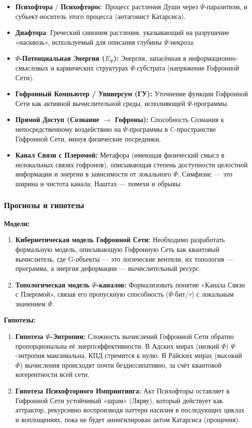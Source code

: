 \documentclass[a4paper,12pt]{article}
\begin{document}
\begin{itemize}
	\item \textbf{Психофтора} / \textbf{Психофторос}: Процесс растления Души через $\Psi$-паразитизм, и субъект-носитель этого процесса (антагонист Катарсиса).
	\item \textbf{Диафтора}: Греческий синоним растления, указывающий на разрушение «насквозь», используемый для описания глубины $\Psi$-некроза.
	\item \textbf{$\Psi$-Потенциальная Энергия ($E_{\Psi}$):} Энергия, запасённая в информационно-смысловых и кармических структурах $\Psi$-субстрата (напряжение Гофронной Сети).
	\item \textbf{Гофронный Компьютер / Универсум (ГУ):} Уточнение функции Гофронной Сети как активной вычислительной среды, исполняющей $\Psi$-программы.
	\item \textbf{Прямой Доступ (Сознание $\to$ Гофроны):} Способность Сознания к непосредственному воздействию на $\Psi$-программы в $\mathbb{C}$-пространстве Гофронной Сети, минуя физические посредники.
	\item \textbf{Канал Связи с Плеромой:} Метафора (имеющая физический смысл в нелокальных связях гофронов), описывающая степень доступности целостной информации и энергии в зависимости от локального $\Phi$. Симфизис — это ширина и чистота канала; Наштах — помехи и обрывы.
\end{itemize}

\subsubsection{Прогнозы и гипотезы}

\textbf{Модели:}
\begin{enumerate}
	\item \textbf{Кибернетическая модель Гофронной Сети:} Необходимо разработать формальную модель, описывающую Гофронную Сеть как квантовый вычислитель, где G-объекты — это логические вентили, их топология — программа, а энергия деформации — вычислительный ресурс.
	\item \textbf{Топологическая модель $\Psi$-каналов:} Формализовать понятие «Канала Связи с Плеромой», связав его пропускную способность ($\Psi$-бит/$\tau$) с локальным значением $\Phi$.
\end{enumerate}

\textbf{Гипотезы:}
\begin{enumerate}
	\item \textbf{Гипотеза $\Psi$-Энтропии:} Сложность вычислений Гофронной Сети обратно пропорциональна её энергоэффективности. В Адских мирах (низкий $\Phi$) $\Psi$-энтропия максимальна, КПД стремится к нулю. В Райских мирах (высокий $\Phi$) вычисления происходят почти бездиссипативно, за счёт квантовой когерентности всей сети.
	\item \textbf{Гипотеза Психофторного Импринтинга:} Акт Психофторы оставляет в Гофронной Сети устойчивый «шрам» (Лярву), который действует как аттрактор, рекурсивно воспроизводя паттерн насилия в последующих циклах и воплощениях, пока не будет аннигилирован актом Катарсиса (прощения).
\end{enumerate}
\end{document}
